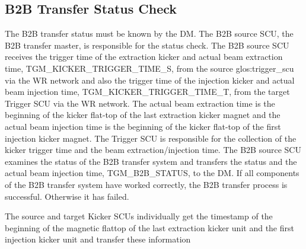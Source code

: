%

\subsection{B2B Transfer Status Check}
The B2B transfer status must be known by the DM. The B2B source SCU, the B2B transfer master, is responsible for the status check. The B2B source SCU receives the trigger time of the extraction kicker and actual beam extraction time, TGM\_KICKER\_TRIGGER\_TIME\_S, from the source \gls{glos:trigger_scu} via the WR network and also the trigger time of the injection kicker and actual beam injection time, TGM\_KICKER\_TRIGGER\_TIME\_T, from the target Trigger SCU via the WR network. The actual beam extraction time is the beginning of the kicker flat-top of the last extraction kicker magnet and the actual beam injection time is the beginning of the kicker flat-top of the first injection kicker magnet. The Trigger SCU is responsible for the collection of the kicker trigger time and the beam extraction/injection time. The B2B source SCU examines the status of the B2B transfer system and transfers the status and the actual beam injection time, TGM\_B2B\_STATUS, to the DM. If all components of the B2B transfer system have worked correctly, the B2B transfer process is successful. Otherwise it has failed. 

The source and target Kicker SCUs
individually get the timestamp of the beginning of the magnetic flattop of the last
extraction kicker unit and the first injection kicker unit and transfer these information
